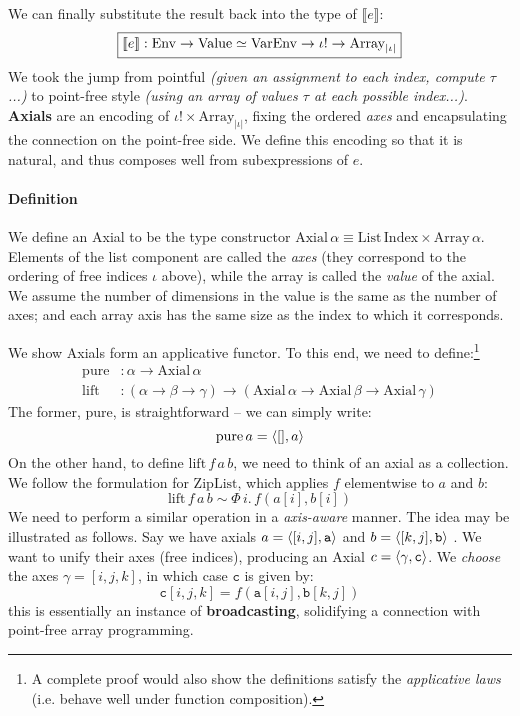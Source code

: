We can finally substitute the result back into the type of $\llbracket e \rrbracket$:
$$ \boxed{ \llbracket e \rrbracket : \mathrm{Env} \to \mathrm{Value} \simeq \mathrm{VarEnv} \to \iota! \to \mathrm{Array}_{|\iota|} } $$
We took the jump from pointful \textit{(given an assignment to each index, compute $\tau$...)} to point-free style \textit{(using an array of values $\tau$ at each possible index...)}. \textbf{Axials} are an encoding of $\iota! \times \mathrm{Array}_{|\iota|}$, fixing the ordered \textit{axes} and encapsulating the connection on the point-free side. We define this encoding so that it is natural, and thus composes well from subexpressions of $e$.

\paragraph{Definition} 
We define an Axial to be the type constructor $\mathrm{Axial}\,\alpha \equiv \mathrm{List}\,\mathrm{Index} \times \mathrm{Array}\,\alpha$. Elements of the list component are called the \textit{axes} (they correspond to the ordering of free indices $\iota$ above), while the array is called the \textit{value} of the axial. We assume the number of dimensions in the value is the same as the number of axes; and each array axis has the same size as the index to which it corresponds.

We show Axials form an applicative functor. To this end, we need to define:\footnote{A complete proof would also show the definitions satisfy the \textit{applicative laws} (i.e. behave well under function composition).}
\begin{align*}
\mathrm{pure} &: \alpha \to \mathrm{Axial}\,\alpha \\
\mathrm{lift} &: (\alpha \to \beta \to \gamma) \to (\mathrm{Axial}\,\alpha \to \mathrm{Axial}\,\beta \to \mathrm{Axial}\,\gamma) 
\end{align*}
The former, $\mathrm{pure}$, is straightforward -- we can simply write:
$$ \mathrm{pure}\,a = \phipair{[]}{a} $$
On the other hand, to define $\mathrm{lift}\,f\,a\,b$, we need to think of an axial as a collection. We follow the formulation for $\mathrm{ZipList}$, which applies $f$ elementwise to $a$ and $b$:
$$ \mathrm{lift}\,f\,a\,b \sim \Phi\, i.\, f(a[i], b[i]) $$
We need to perform a similar operation in a \textit{axis-aware} manner. The idea may be illustrated as follows. Say we have axials $a = \phipair{[i, j]}{\texttt{a}}$ and $b = \phipair{[k, j]}{\texttt{b}}$ . We want to unify their axes (free indices), producing an Axial $c = \phipair{\gamma}{\texttt{c}}$. We \textit{choose} the axes $\gamma = [i, j, k]$, in which case $\texttt{c}$ is given by:
$$ \texttt{c}[i, j, k] = f(\texttt{a}[i, j], \texttt{b}[k, j]) $$
this is essentially an instance of \textbf{broadcasting}, solidifying a connection with point-free array programming.

